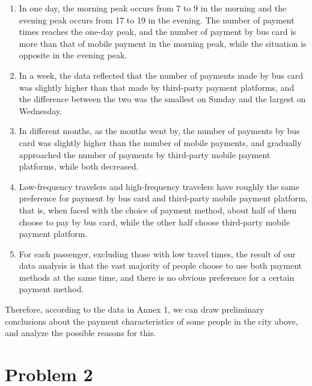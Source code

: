 \documentclass[../mcmpaper]{subfiles}
\begin{document}
\begin{enumerate}[label=\arabic*)]
    \item In one day, the morning peak occurs from 7 to 9 in the morning and the evening peak occurs from 17 to 19 in the evening. The number of payment times reaches the one-day peak, and the number of payment by bus card is more than that of mobile payment in the morning peak, while the situation is opposite in the evening peak.
    \item In a week, the data reflected that the number of payments made by bus card was slightly higher than that made by third-party payment platforms, and the difference between the two was the smallest on Sunday and the largest on Wednesday.
    \item In different months, as the months went by, the number of payments by bus card was slightly higher than the number of mobile payments, and gradually approached the number of payments by third-party mobile payment platforms, while both decreased.
    \item Low-frequency travelers and high-frequency travelers have roughly the same preference for payment by bus card and third-party mobile payment platform, that is, when faced with the choice of payment method, about half of them choose to pay by bus card, while the other half choose third-party mobile payment platform.
    \item For each passenger, excluding those with low travel times, the result of our data analysis is that the vast majority of people choose to use both payment methods at the same time, and there is no obvious preference for a certain payment method.
\end{enumerate}
Therefore, according to the data in Annex 1, we can draw preliminary conclusions about the payment characteristics of some people in the city above, and analyze the possible reasons for this.
\section{Problem 2}
\end{document}
